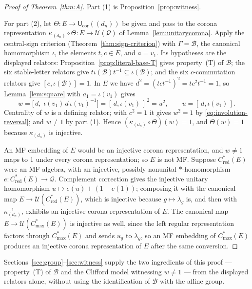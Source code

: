 \documentclass[11pt]{amsart}
\newcommand{\leanverified}[2]{\ignorespaces}
\theoremstyle{definition}
\theoremstyle{remark}
\theoremstyle{plain}
\newcommand{\U}{\mathcal U}
\newcommand{\Ucor}{\mathsf U_{\mathrm{cor}}}
\newcommand{\Cmax}{C^*_{\mathrm{max}}}
\newcommand{\Cred}{C^*_{\mathrm{red}}}
\begin{document}
\begin{proof}[Proof of Theorem~\ref{thm:A}]
Part (1) is Proposition~\ref{prop:witness}.

For part (2), let $\Theta\colon E\to\Ucor((d_n))$ be given and pass to
the corona representation $\kappa_{(d_n)}\circ\Theta\colon
E\to\U(\mathcal Q)$ of Lemma~\ref{lem:unitarycorona}.  Apply the
central-sign criterion (Theorem~\ref{thm:sign-criterion}) with
$\Gamma=\mathcal B$, the canonical homomorphism $\iota$, the elements
$t,c\in E$, and $a=v_1$.  Its hypotheses are the displayed relators:
Proposition~\ref{prop:literal-base-T} gives property~\textup{(T)} of
$\mathcal B$; the six stable-letter relators give
$t\iota(\mathcal B)t^{-1}\subseteq\iota(\mathcal B)$; and the six
$c$-commutation relators give $[c,\iota(\mathcal B)]=1$.  In $E$ we
have $d^2=(tct^{-1})^2=tc^2t^{-1}=1$, so Lemma~\ref{lem:square} with
$a_1=\iota(v_1)$ gives
\[
  w=\bigl[\,d,\;\iota(v_1)\,d\,\iota(v_1)^{-1}\bigr]
  =[\,d,\iota(v_1)\,]^{\,2}=u^2 ,
  \qquad u=[\,d,\iota(v_1)\,].
\]
Centrality of $w$ is a defining relator; with $c^2=1$ it gives $w^2=1$
by \eqref{eq:involution-reversal}; and $w\ne1$ by part (1).  Hence
$(\kappa_{(d_n)}\circ\Theta)(w)=1$, and $\Theta(w)=1$ because
$\kappa_{(d_n)}$ is injective.
\leanverified{Sofic/LiteralNonMFEndpoint}{GroupApproximation.LiteralNonMFEndpoint.negativeCorner_kazhdanTransport_contradiction}

An MF embedding of $E$ would be an injective corona representation, and
$w\ne1$ maps to $1$ under every corona representation; so $E$ is not
MF\@.  Suppose $\Cred(E)$ were an MF algebra, with an injective,
possibly nonunital $*$-homomorphism $e\colon\Cred(E)\to\mathcal Q$.
Complement correction gives the injective unitary homomorphism
$u\mapsto e(u)+(1-e(1))$; composing it with the canonical map
$E\to\U(\Cred(E))$, which is injective because $g\mapsto\lambda_g$ is,
and then with $\kappa_{(d_n)}^{-1}$, exhibits an injective corona
representation of $E$.  The canonical map $E\to\U(\Cmax(E))$ is
injective as well, since the left regular representation factors
through $\Cmax(E)$ and sends $u_g$ to $\lambda_g$, so an MF embedding
of $\Cmax(E)$ produces an injective corona representation of $E$ after
the same conversion.
\end{proof}

Sections~\ref{sec:group}--\ref{sec:witness} supply the two ingredients
of this proof --- property~\textup{(T)} of $\mathcal B$ and the
Clifford model witnessing $w\ne1$ --- from the displayed relators
alone, without using the identification of $\mathcal B$ with the affine
group.
\end{document}
